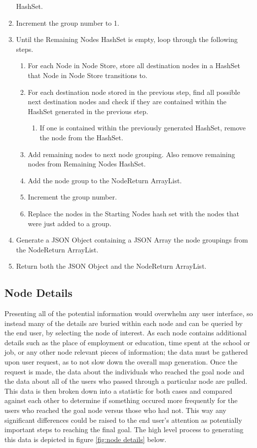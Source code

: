 \begin{enumerate}
   HashSet.
   \item Increment the group number to 1.
   \item Until the Remaining Nodes HashSet is empty, loop through the following
   steps.
   \begin{enumerate}
     \item For each Node in Node Store, store all destination nodes in a HashSet
     that Node in Node Store transitions to.
     \item For each destination node stored in the previous step, find all
     possible next destination nodes and check if they are contained within the
     HashSet generated in the previous step.
     \begin{enumerate}
       \item If one is contained within the previously generated HashSet, remove
       the node from the HashSet.
     \end{enumerate}
     \item Add remaining nodes to next node grouping.  Also remove remaining
     nodes from Remaining Nodes HashSet.
     \item Add the node group to the NodeReturn ArrayList.
     \item Increment the group number.
     \item Replace the nodes in the Starting Nodes hash set with the nodes that
     were just added to a group.
   \end{enumerate} 
   \item Generate a JSON Object containing a JSON Array the node groupings from
   the NodeReturn ArrayList.
   \item Return both the JSON Object and the NodeReturn ArrayList.
 \end{enumerate}



\subsection{Node Details}
Presenting all of the potential information would overwhelm any user interface,
so instead many of the details are buried within each node and can be queried
by the end user, by selecting the node of interest.  As each node contains
additional details such as the place of employment or education, time spent at
the school or job, or any other node relevant pieces of information; the data
must be gathered upon user request, as to not slow down the overall map
generation.  Once the request is made, the data about the individuals who
reached the goal node and the data about all of the users who passed through a
particular node are pulled.  This data is then broken down into a statistic for
both cases and compared against each other to determine if something occured
more frequently for the users who reached the goal node versus those who had
not.  This way any significant differences could be raised to the end user's
attention as potentially important steps to reaching the final goal.  The high
level process to generating this data is depicted in figure \ref{fig:node
details} below.

